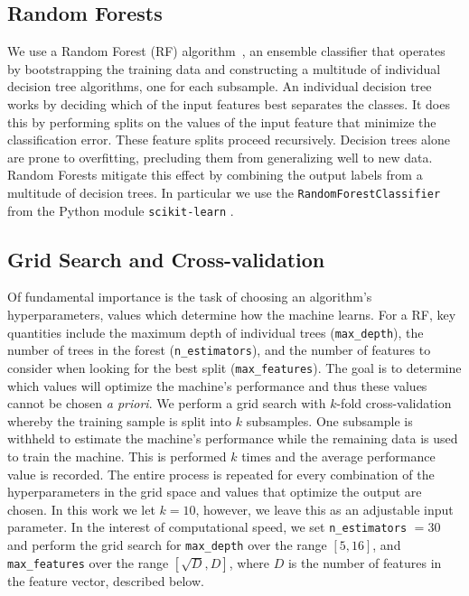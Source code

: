 \documentclass[twocolumn]{aastex6}
\begin{document}
\subsection{Random Forests}
We use a Random Forest (RF) algorithm~\citep{Breiman2001},  
an ensemble classifier that operates by
 bootstrapping the training data and constructing a multitude of individual decision 
tree algorithms, one for each subsample.  
An individual decision tree works by deciding which of 
the input features best separates the classes. It does this by performing 
splits on the values of the input feature that minimize the classification 
error. These feature splits proceed recursively. Decision trees alone are
 prone to overfitting, precluding them from generalizing 
well to new data. Random Forests mitigate this effect by combining the 
output labels from a multitude of decision trees.  In particular we use the 
\texttt{RandomForestClassifier} from the Python module \texttt{scikit-learn}
\citep{scikit-learn}. 


\subsection{Grid Search and Cross-validation}
Of fundamental importance is the task of choosing an algorithm's hyperparameters, 
values which determine how the machine learns.   For a RF, key quantities include
 the maximum depth of individual trees (\texttt{max\_depth}), the number of trees
in the forest (\texttt{n\_estimators}), and the number of features to consider when 
looking for the best split (\texttt{max\_features}). 
The goal is to determine which values will optimize 
the machine's performance and thus these values cannot be chosen \textit{a priori}. 
We perform a grid search with $k$-fold cross-validation whereby the 
training sample is split into $k$ subsamples. One subsample is withheld to 
estimate the machine's performance while the remaining data is used to train the machine. 
This is performed $k$ times and the average performance
value is recorded. The entire process is repeated for every combination of the 
 hyperparameters in the grid space and values that optimize the output are chosen. 
In this work we let $k=10$, however, we leave this as an adjustable input parameter.
In the interest of computational speed, we set \texttt{n\_estimators} $=30$ and 
perform the grid search for \texttt{max\_depth} over the range $[5,16]$, and 
\texttt{max\_features} over the range $[\sqrt{D}, D]$,
where $D$ is the number of features in the feature vector, described below.
 
\end{document}
